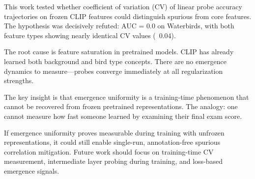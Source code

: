 
This work tested whether coefficient of variation (CV) of linear probe accuracy trajectories on frozen CLIP features could distinguish spurious from core features. The hypothesis was decisively refuted: AUC = 0.0 on Waterbirds, with both feature types showing nearly identical CV values (~0.04).

The root cause is feature saturation in pretrained models. CLIP has already learned both background and bird type concepts. There are no emergence dynamics to measure---probes converge immediately at all regularization strengths.

The key insight is that emergence uniformity is a training-time phenomenon that cannot be recovered from frozen pretrained representations. The analogy: one cannot measure how fast someone learned by examining their final exam score.

If emergence uniformity proves measurable during training with unfrozen representations, it could still enable single-run, annotation-free spurious correlation mitigation. Future work should focus on training-time CV measurement, intermediate layer probing during training, and loss-based emergence signals.

